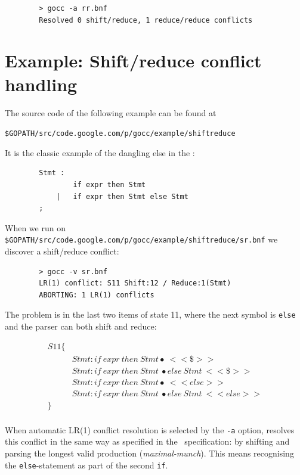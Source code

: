 \documentclass[12pt]{article}
\begin{document}
	\begin{verbatim}
		> gocc -a rr.bnf
		Resolved 0 shift/reduce, 1 reduce/reduce conflicts
	\end{verbatim}

\section{Example: Shift/reduce conflict handling} \label{sec:example sr}
	The source code of the following example can be found at

	\verb|$GOPATH/src/code.google.com/p/gocc/example/shiftreduce|

	It is the classic example of the dangling else in the \Clang:

	\begin{verbatim}
		Stmt :
		        if expr then Stmt
		    |   if expr then Stmt else Stmt
		;
	\end{verbatim}

	When we run \gocc on \verb|$GOPATH/src/code.google.com/p/gocc/example/shiftreduce/sr.bnf| we discover a shift/reduce conflict:

	\begin{verbatim}
		> gocc -v sr.bnf
		LR(1) conflict: S11 Shift:12 / Reduce:1(Stmt)
		ABORTING: 1 LR(1) conflicts
	\end{verbatim}

	The problem is in the last two items of state 11, where the next symbol is \verb|else| and the parser can both shift and reduce:

	\[
		\begin{array}{ll}
			S11 \{ \\
			  & Stmt : if\ expr\ then\ Stmt\bullet\ <<\$>> \\
			  & Stmt : if\ expr\ then\ Stmt\ \bullet else\ Stmt\ <<\$>> \\
			  & Stmt : if\ expr\ then\ Stmt \bullet\ <<else>> \\
			  & Stmt : if\ expr\ then\ Stmt\ \bullet else\ Stmt\ <<else>> \\
			\} \\
		\end{array}
	\]

	When automatic LR(1) conflict resolution is selected by the \verb|-a| option, \gocc resolves this conflict in the same way as specified in the \Clang\ specification: by shifting and parsing the longest valid production ({\em maximal-munch}). This means recognising the \verb|else|-statement as part of the second \verb|if|.
\end{document}
